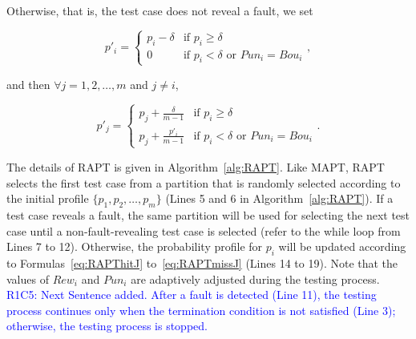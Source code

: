 \documentclass[10pt,journal,compsoc]{IEEEtran}
\begin{document}
Otherwise, that is, the test case does not reveal a fault, we set

\begin{equation}
\label{eq:RAPTmissI}
p'_i =
\begin{cases}
p_i - \delta & \text{if } p_i \geq \delta \\
0 & \text{if } p_i < \delta \text{ or } Pun_i = Bou_i
\end{cases},
\end{equation}

and then $\forall j = 1, 2, \ldots, m$ and $j \neq i$,

\begin{equation}
\label{eq:RAPTmissJ}
p'_j =
\begin{cases}
p_j + \displaystyle\frac{\delta}{m-1} & \text{if } p_i \geq \delta \\
p_j + \displaystyle\frac{p'_i}{m-1} & \text{if } p_i < \delta \text{ or } Pun_i = Bou_i
\end{cases}.
\end{equation}

The details of RAPT is given in Algorithm~\ref{alg:RAPT}. Like MAPT, RAPT selects the first test case from a partition that is randomly selected according to the initial profile $\{p_1, p_2, \ldots, p_m\}$ (Lines 5 and 6 in Algorithm~\ref{alg:RAPT}). If a test case reveals a fault, the same partition will be used for selecting the next test case until a non-fault-revealing test case is selected (refer to the while loop from Lines 7 to 12). Otherwise, the probability profile for $p_i$ will be updated according to Formulas~\ref{eq:RAPThitJ} to~\ref{eq:RAPTmissJ} (Lines 14 to 19). Note that the values of $Rew_i$ and $Pun_i$ are adaptively adjusted during the testing process. \textcolor{blue}{R1C5: Next Sentence added.
After a fault is detected (Line 11), the testing process continues only when the termination condition is not satisfied (Line 3); otherwise, the testing process is stopped.}
\end{document}
